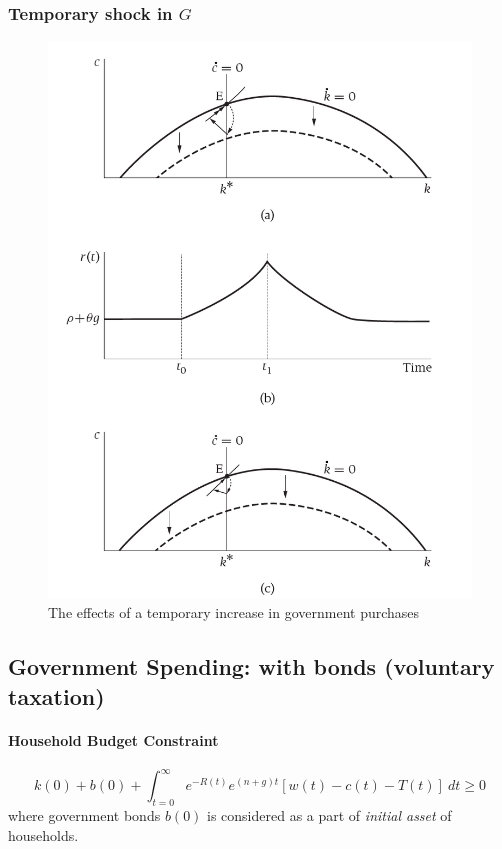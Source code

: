 \documentclass[]{article}
\begin{document}
			\subsubsection{Temporary shock in $G$}
				\begin{figure}[h]
					\centering
					\includegraphics[width=0.7\linewidth]{figures/8_1}
					\caption{The effects of a temporary increase in government purchases}
				\end{figure}
		\newpage
		\subsection{Government Spending: with bonds (voluntary taxation)}
			\paragraph{Household Budget Constraint}
				\begin{equation}
					k(0) + b(0) + \int_{t=0}^\infty {e^{-R(t)} e^{(n+g)t} [w(t) - c(t) - T(t)]}\ dt \geq 0
				\end{equation}
				where government bonds $b(0)$ is considered as a part of \emph{initial asset} of households.
\end{document}
